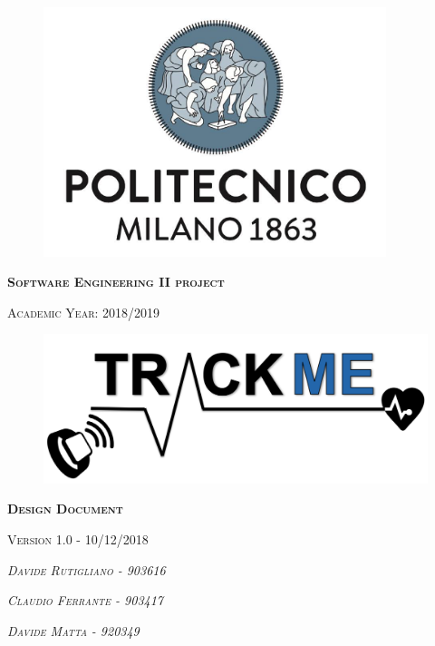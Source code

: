 \thispagestyle{empty}
\begin{figure}[!h]
	\centering
	\includegraphics[width=100mm]{Images/poli-logo.png}
\end{figure}
\hfill
\begin{center}
    \fontsize{18px}{6mm}\selectfont \textsc{\textbf{Software Engineering II project}}
\end{center}
\begin{center}
    \fontsize{12px}{4mm}\selectfont \textsc{Academic Year: 2018/2019}
\end{center}
\hfill
\hfill
\begin{figure}[!h]
	\centering
	\includegraphics[width=120mm]{Images/trackme-logo.png}
\end{figure}
\hfill
\hfill
\begin{center}
    \fontsize{22px}{8mm}\selectfont \textsc{\textbf{Design Document}}
\end{center}
\begin{center}
    \fontsize{14px}{4mm}\selectfont \textsc{{Version 1.0 - 10/12/2018}}
\end{center}
\hfill
\hfill
\begin{center}
\fontsize{14px}{4mm}\selectfont \textsc{\textit{Davide Rutigliano -  903616}}
\end{center}

\begin{center}
\fontsize{14px}{4mm}\selectfont \textsc{\textit{Claudio Ferrante - 903417\\}}
\end{center}

\begin{center}
\fontsize{14px}{4mm}\selectfont \textsc{\textit{Davide Matta - 920349}}
\end{center}